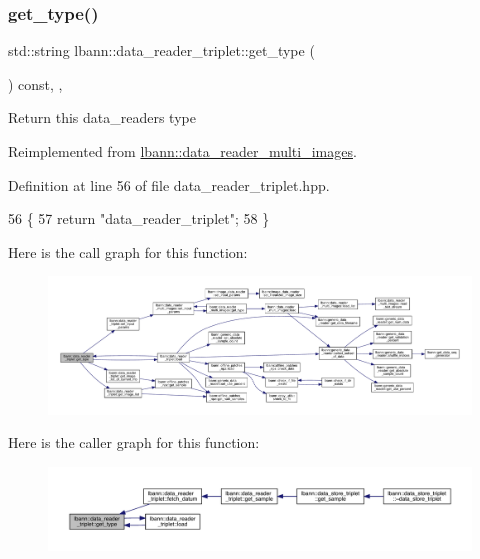 \subsubsection{\texorpdfstring{get\+\_\+type()}{get\_type()}}
{\footnotesize\ttfamily std\+::string lbann\+::data\+\_\+reader\+\_\+triplet\+::get\+\_\+type (\begin{DoxyParamCaption}{ }\end{DoxyParamCaption}) const\hspace{0.3cm}{\ttfamily [inline]}, {\ttfamily [override]}, {\ttfamily [virtual]}}

Return this data\+\_\+reader\textquotesingle{}s type 

Reimplemented from \hyperlink{classlbann_1_1data__reader__multi__images_a9939a88a40caf7b2a27de08deca54ac1}{lbann\+::data\+\_\+reader\+\_\+multi\+\_\+images}.



Definition at line 56 of file data\+\_\+reader\+\_\+triplet.\+hpp.


\begin{DoxyCode}
56                                       \{
57     \textcolor{keywordflow}{return} \textcolor{stringliteral}{"data\_reader\_triplet"};
58   \}
\end{DoxyCode}
Here is the call graph for this function\+:\nopagebreak
\begin{figure}[H]
\begin{center}
\leavevmode
\includegraphics[width=350pt]{classlbann_1_1data__reader__triplet_a7ff627eed9a4671129cbf7fb9ca11871_cgraph}
\end{center}
\end{figure}
Here is the caller graph for this function\+:\nopagebreak
\begin{figure}[H]
\begin{center}
\leavevmode
\includegraphics[width=350pt]{classlbann_1_1data__reader__triplet_a7ff627eed9a4671129cbf7fb9ca11871_icgraph}
\end{center}
\end{figure}
\mbox{\label{classlbann_1_1data__reader__triplet_a2601234d6d501df6170c6fb60dfb873e}} 
